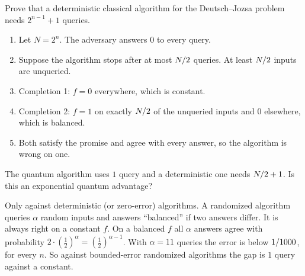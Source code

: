 \begin{exercisebox}
\begin{pproblem}\label{pp:dj-lb}
    Prove that a deterministic classical algorithm for the Deutsch--Jozsa problem needs
    $2^{n-1} + 1$ queries.
\end{pproblem}
\tcblower
\begin{wsolution}
    \leavevmode
    \begin{enumerate}
        \item Let $N = 2^n$. The adversary answers $0$ to every query.
        \item Suppose the algorithm stops after at most $N/2$ queries. At least
              $N/2$ inputs are unqueried.
        \item Completion 1: $f = 0$ everywhere, which is constant.
        \item Completion 2: $f = 1$ on exactly $N/2$ of the unqueried inputs and $0$
              elsewhere, which is balanced.
        \item Both satisfy the promise and agree with every answer, so the algorithm is wrong on one. \qedhere
    \end{enumerate}
\end{wsolution}
\end{exercisebox}

\begin{exercisebox}
\begin{pproblem}\label{pp:dj-speedup}
    The quantum algorithm uses $1$ query and a deterministic one needs $N/2 + 1$. Is this
    an exponential quantum advantage?
\end{pproblem}
\tcblower
\begin{wsolution}
    Only against deterministic (or zero-error) algorithms. A randomized algorithm queries $\alpha$
    random inputs and answers ``balanced'' if two answers differ. It is always right on a constant
    $f$. On a balanced $f$ all $\alpha$ answers agree with probability
    $2 \cdot \left(\frac{1}{2}\right)^{\alpha} = \left(\frac{1}{2}\right)^{\alpha - 1}$. With
    $\alpha = 11$ queries the error is below $1/1000$, for every $n$. So against
    bounded-error randomized algorithms the gap is $1$ query against a constant.
\end{wsolution}
\end{exercisebox}

